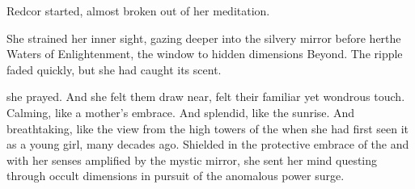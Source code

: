 \stamp{\dateMutiny}{\TopazChateau, \Redce}
%

%
%
%
%
%

Redcor \Matron{} \EsmerelFull{} started, almost broken out of her meditation.  


She strained her inner sight, gazing deeper into the silvery mirror before her\dash the Waters of Enlightenment, the window to hidden dimensions Beyond. The ripple faded quickly, but she had caught its scent. 

 she prayed.  And she felt them draw near, felt their familiar yet wondrous touch. Calming, like a mother's embrace. And splendid, like the sunrise. And breathtaking, like the view from the high towers of the \TopazChateau{} when she had first seen it as a young girl, many decades ago. Shielded in the protective embrace of the \sephiroth{} and with her senses amplified by the mystic mirror, she sent her mind questing through occult dimensions in pursuit of the anomalous power surge. 

